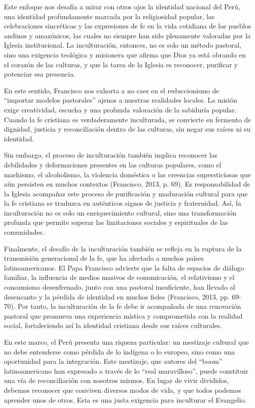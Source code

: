 \documentclass[12pt]{article}
\begin{document}
	Este enfoque nos desafía a mirar con otros ojos la identidad nacional del Perú, una identidad profundamente marcada por la religiosidad popular, las celebraciones sincréticas y las expresiones de fe en la vida cotidiana de los pueblos andinos y amazónicos, las cuales no siempre han sido plenamente valoradas por la Iglesia institucional. La inculturación, entonces, no es solo un método pastoral, sino una exigencia teológica y misionera que afirma que Dios ya está obrando en el corazón de las culturas, y que la tarea de la Iglesia es reconocer, purificar y potenciar esa presencia.
	
	En este sentido, Francisco nos exhorta a no caer en el reduccionismo de “importar modelos pastorales” ajenos a nuestras realidades locales. La misión exige creatividad, escucha y una profunda valoración de la sabiduría popular. Cuando la fe cristiana es verdaderamente inculturada, se convierte en fermento de dignidad, justicia y reconciliación dentro de las culturas, sin negar sus raíces ni su identidad.
	
	Sin embargo, el proceso de inculturación también implica reconocer las debilidades y deformaciones presentes en las culturas populares, como el machismo, el alcoholismo, la violencia doméstica o las creencias supersticiosas que aún persisten en muchos contextos (Francisco, 2013, p. 69)\nocite{Francisco2013}. Es responsabilidad de la Iglesia acompañar este proceso de purificación y maduración cultural para que la fe cristiana se traduzca en auténticos signos de justicia y fraternidad. Así, la inculturación no es solo un enriquecimiento cultural, sino una transformación profunda que permite superar las limitaciones sociales y espirituales de las comunidades.
	
	Finalmente, el desafío de la inculturación también se refleja en la ruptura de la transmisión generacional de la fe, que ha afectado a muchos países latinoamericanos. El Papa Francisco advierte que la falta de espacios de diálogo familiar, la influencia de medios masivos de comunicación, el relativismo y el consumismo desenfrenado, junto con una pastoral insuficiente, han llevado al desencanto y la pérdida de identidad en muchos fieles (Francisco, 2013, pp. 69-70)\nocite{Francisco2013}. Por tanto, la inculturación de la fe debe ir acompañada de una renovación pastoral que promueva una experiencia mística y comprometida con la realidad social, fortaleciendo así la identidad cristiana desde sus raíces culturales.
	
	En este marco, el Perú presenta una riqueza particular: un mestizaje cultural que no debe entenderse como pérdida de lo indígena o lo europeo, sino como una oportunidad para la integración. Este mestizaje, que autores del “boom” latinoamericano han expresado a través de lo “real maravilloso”, puede constituir una vía de reconciliación con nosotros mismos. En lugar de vivir divididos, debemos reconocer que conviven diversos modos de vida, y que todos podemos aprender unos de otros. Esta es una justa exigencia para inculturar el Evangelio.
	
\end{document}
